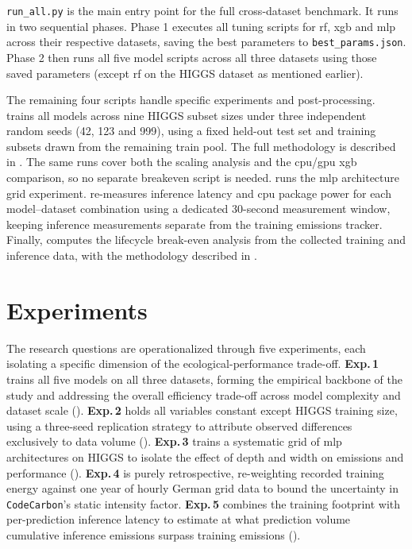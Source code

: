 \texttt{run\_all.py} is the main entry point for the full cross-dataset benchmark. It runs in two sequential phases. Phase 1 executes all tuning scripts for \gls{rf}, \gls{xgb} and \gls{mlp} across their respective datasets, saving the best parameters to \texttt{best\_params.json}. Phase 2 then runs all five model scripts across all three datasets using those saved parameters (except \gls{rf} on the HIGGS dataset as mentioned earlier).

The remaining four scripts handle specific experiments and post-processing.  trains all models across nine HIGGS subset sizes under three independent random seeds (42, 123 and 999), using a fixed held-out test set and training subsets drawn from the remaining train pool. The full methodology is described in . The same runs cover both the scaling analysis and the \gls{cpu}/\gls{gpu} \gls{xgb} comparison, so no separate breakeven script is needed.  runs the \gls{mlp} architecture grid experiment.  re-measures inference latency and \gls{cpu} package power for each model--dataset combination using a dedicated 30-second measurement window, keeping inference measurements separate from the training emissions tracker. Finally,  computes the lifecycle break-even analysis from the collected training and inference data, with the methodology described in .

\section{Experiments}
\label{sec:experiments}

The research questions are operationalized through five experiments, each isolating a specific dimension of the ecological-performance trade-off. \textbf{Exp.\,1} trains all five models on all three datasets, forming the empirical backbone of the study and addressing the overall efficiency trade-off across model complexity and dataset scale (). \textbf{Exp.\,2} holds all variables constant except HIGGS training size, using a three-seed replication strategy to attribute observed differences exclusively to data volume (). \textbf{Exp.\,3} trains a systematic grid of \gls{mlp} architectures on HIGGS to isolate the effect of depth and width on emissions and performance (). \textbf{Exp.\,4} is purely retrospective, re-weighting recorded training energy against one year of hourly German grid data to bound the uncertainty in \texttt{CodeCarbon}'s static intensity factor. \textbf{Exp.\,5} combines the training footprint with per-prediction inference latency to estimate at what prediction volume cumulative inference emissions surpass training emissions ().

